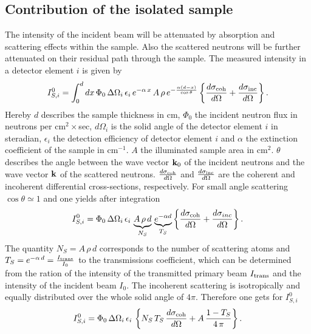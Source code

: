 \subsection{Contribution of the isolated sample}
The intensity of the incident beam will be attenuated by absorption
and scattering effects within the sample. Also the scattered neutrons
will be further attenuated on their residual path through the sample.
The measured intensity in a detector element  $i$ is given by
\begin{equation}
I^0_{S,i} = \int^d_0 dx\, \Phi_0\, \Delta \Omega_i\, \epsilon_i\,
e^{-\alpha\,x}\, A\, \rho \, e^{-\frac{\alpha(d-x)}{\cos\theta}}
\left\{ \frac{d\sigma_{\rm coh}}{d\Omega} + \frac{d\sigma_{\rm inc}}{d\Omega}
\right\}
.
\end{equation}
Hereby $d$ describes the sample thickness in cm, $\Phi_0$ the incident neutron
flux in neutrons per cm$^2\times$sec, $d\Omega_i$ is the solid angle of the detector
element $i$ in steradian, $\epsilon_i$ the detection efficiency of detector element
$i$ and $\alpha$ the extinction coefficient of the sample in cm$^{-1}$. $A$ the illuminated
sample area in cm$^2$. $\theta$ describes the angle between the wave vector  ${\bf k}_0$ of
the incident neutrons and the wave vector ${\bf k}$ of the scattered neutrons.
$\frac{d\sigma_{\rm coh}}{d\Omega}$ and
$\frac{d\sigma_{\rm inc}}{d\Omega}$ are the coherent and incoherent differential cross-sections,
respectively.
For small angle scattering $\cos\theta \simeq 1$ and one yields after integration
\begin{equation}
I^0_{S,i} = \Phi_0\, \Delta \Omega_i\, \epsilon_i\,
\underbrace{A\, \rho \,d}_{N_S}\, \underbrace{e^{-\alpha d}}_{T_S}
\left\{ \frac{d\sigma_{\rm coh}}{d\Omega} + \frac{d\sigma_{inc}}{d\Omega}
\right\}
.
\end{equation}
The quantity $N_S = A\, \rho\, d$ corresponds to the number of scattering
atoms and $T_S = e^{-\alpha\, d} = \frac{I_{\rm trans}}{I_0}$ to the transmissions
coefficient, which can be determined from the ration of the intensity of the
transmitted primary beam $I_{\rm trans}$ and the intensity of the incident beam
$I_0$. The incoherent scattering is isotropically and equally distributed over
the whole solid angle of  $4\pi$. Therefore one gets for $I^0_{S,i}$
\begin{equation}
I^0_{S,i} = \Phi_0\, \Delta \Omega_i\, \epsilon_i\,
\left\{ N_S\, T_S \, \frac{d\sigma_{\rm coh}}{d\Omega} + A\, \frac{1-T_S}{4\,
\pi} \right\} . \label{dsdotheo}
\end{equation}

